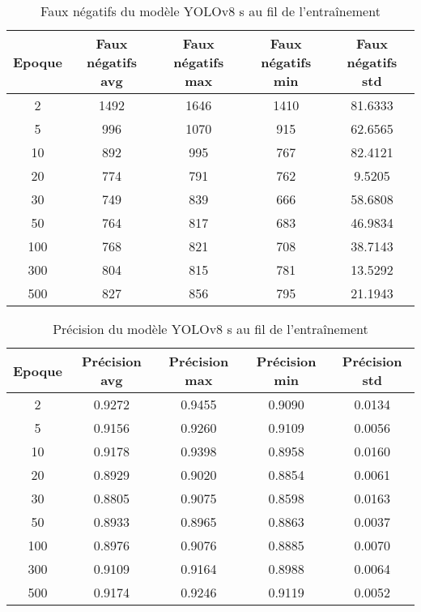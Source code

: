 \begin{table}[!ht]
    \caption{Faux négatifs du modèle YOLOv8 s au fil de l'entraînement}
    \label{tab:yolov8s_false_negative}
    \centering
    \begin{tabular}{ |c||c|c|c|c|  }
        \hline
        \rowcolor{gray!50}
        Epoque & Faux négatifs avg & Faux négatifs max & Faux négatifs min & Faux négatifs std\\
        \hline
        2 & 1492 & 1646 & 1410 & 81.6333\\
        5 & 996 & 1070 & 915 & 62.6565\\
        10 & 892 & 995 & 767 & 82.4121\\
        20 & 774 & 791 & 762 & 9.5205\\
        30 & 749 & 839 & 666 & 58.6808\\
        50 & 764 & 817 & 683 & 46.9834\\
        100 & 768 & 821 & 708 & 38.7143\\
        300 & 804 & 815 & 781 & 13.5292\\
        500 & 827 & 856 & 795 & 21.1943\\
        \hline
    \end{tabular}
\end{table}

\begin{table}[!ht]
    \caption{Précision du modèle YOLOv8 s au fil de l'entraînement}
    \label{tab:yolov8s_precision}
    \centering
    \begin{tabular}{ |c||c|c|c|c|  }
        \hline
        \rowcolor{gray!50}
        Epoque & Précision avg & Précision max & Précision min & Précision std\\
        \hline
        2 & 0.9272 & 0.9455 & 0.9090 & 0.0134\\
        5 & 0.9156 & 0.9260 & 0.9109 & 0.0056\\
        10 & 0.9178 & 0.9398 & 0.8958 & 0.0160\\
        20 & 0.8929 & 0.9020 & 0.8854 & 0.0061\\
        30 & 0.8805 & 0.9075 & 0.8598 & 0.0163\\
        50 & 0.8933 & 0.8965 & 0.8863 & 0.0037\\
        100 & 0.8976 & 0.9076 & 0.8885 & 0.0070\\
        300 & 0.9109 & 0.9164 & 0.8988 & 0.0064\\
        500 & 0.9174 & 0.9246 & 0.9119 & 0.0052\\
        \hline
    \end{tabular}
\end{table}

